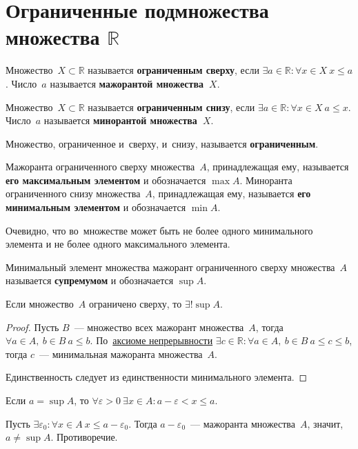 \section{Ограниченные подмножества множества \texorpdfstring{$\mathbb R$}{}}
 Множество~$X \subset \mathbb R$ называется \textbf{ограниченным сверху}, если $\exists a \in \mathbb R \colon \forall x \in X \ x \leqslant a$.
Число~$a$ называется \textbf{мажорантой множества~$X$}.

 Множество~$X \subset \mathbb R$ называется \textbf{ограниченным снизу}, если $\exists a \in \mathbb R \colon \forall x \in X \ a \leqslant x$.
Число~$a$ называется \textbf{минорантой множества~$X$}.

Множество, ограниченное и~сверху, и~снизу, называется \textbf{ограниченным}.

 Мажоранта ограниченного сверху множества~$A$, принадлежащая ему, называется \textbf{его максимальным элементом} и обозначается $\max A$.
 Миноранта ограниченного снизу множества~$A$, принадлежащая ему, называется \textbf{его минимальным элементом} и обозначается $\min A$.

Очевидно, что во~множестве может быть не более одного минимального элемента и не более одного максимального элемента.

 Минимальный элемент множества мажорант ограниченного сверху множества~$A$ называется \textbf{супремумом} и обозначается $\sup A$.

\begin{statement}
\label{st:single_supremum}
Если множество~$A$ ограничено сверху, то $\exists! \sup A$.
\end{statement}
\begin{proof}
Пусть $B$~--- множество всех мажорант множества~$A$, тогда $\forall a \in A, \ b \in B \ a \leqslant b$.
По~\hyperlink{eq:continuity_axiom}{аксиоме непрерывности} $\exists c \in \mathbb R \colon \forall a \in A, \ b \in B \ a \leqslant c \leqslant b$, тогда $c$~--- минимальная мажоранта множества~$A$.

Единственность следует из единственности минимального элемента.
\end{proof}

\begin{statement}
\label{st:inequality_of_supremum}
Если $a = \sup A$, то
$\forall \varepsilon > 0 \ \exists x \in A \colon a - \varepsilon < x \leqslant a$.
\end{statement}
\begin{proofcontra}
Пусть $\exists \varepsilon_0 \colon \forall x \in A \ x \leqslant a - \varepsilon_0$.
Тогда $a - \varepsilon_0$~--- мажоранта множества~$A$, значит, $a \neq \sup A$.
Противоречие.
\end{proofcontra}

